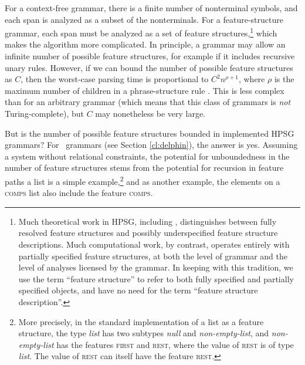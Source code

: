 \documentclass[output=paper,nonflat]{langsci/langscibook}
\begin{document}
For a context-free grammar, there is a finite number of nonterminal symbols,
and each span is analyzed as a subset of the nonterminals.
For a feature-structure grammar, each span must be analyzed as a set of feature structures,\footnote{%
	Much theoretical work in HPSG, including \citet{ps2},
	distinguishes between fully resolved feature structures and possibly underspecified feature structure descriptions.
	Much computational work, by contrast, operates entirely with partially specified feature structures,
	at both the level of grammar and the level of analyses licensed by the grammar.
	In keeping with this tradition, we use the term
	``feature structure'' to refer to both fully specified and partially specified objects,
	and have no need for the term ``feature structure description''.
}
which makes the algorithm more complicated.
In principle, a grammar may allow an infinite number of possible feature structures,
for example if it includes recursive unary rules.
However, if we can bound the number of possible feature structures as $C$,
then the worst-case parsing time is proportional to $C^2 n^{\rho+1}$,
where $\rho$ is the maximum number of children in a phrase-structure rule
\citep[Section~3.2.3]{carroll1993parse}. 
This is less complex than for an arbitrary grammar
(which means that this class of grammars is \emph{not} Turing-complete),
but $C$ may nonetheless be very large.



But is the number of possible feature structures bounded
in implemented HPSG grammars?
For \delphin\ grammars (see Section \ref{cl:delphin}),
the answer is yes.
Assuming a system without relational constraints,
the potential for unboundedness in the number of feature structures
stems from the potential for recursion in feature paths
a list is a simple example,\footnote{%
	More precisely, in the standard implementation of a list as a feature structure,
	the type \textit{list} has two subtypes \textit{null} and \textit{non-empty-list}, and
	\textit{non-empty-list} has the features \textsc{first}
	and \textsc{rest}, where the value of \textsc{rest} is of type \textit{list}.
	The value of \textsc{rest} can itself have the feature \textsc{rest}.
}
and as another example, the elements on a \textsc{comps} list
also include the feature \textsc{comps}.
\end{document}
